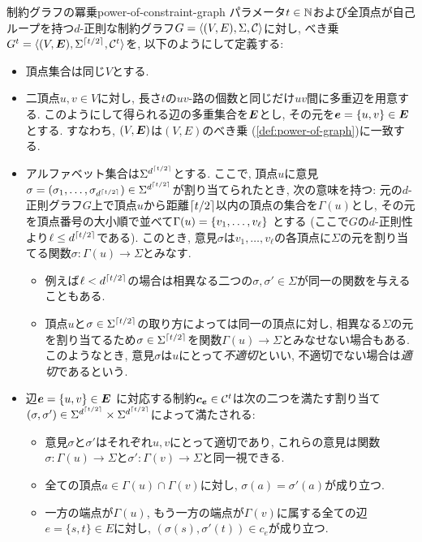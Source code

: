 \begin{definition}{制約グラフの冪乗}{power-of-constraint-graph}
  パラメータ$t\in\mathbb{N}$および全頂点が自己ループを持つ$d$-正則な制約グラフ$G=\langle(V,E),\Sigma,\mathcal{C}\rangle$に対し, べき乗$G^t = \langle(V,\boldsymbol{E}),\Sigma^{\lceil t/2\rceil},\mathcal{C}^t\rangle$を, 以下のようにして定義する:
  \begin{itemize}
    \item 頂点集合は同じ$V$とする.
    \item 二頂点$u,v\in V$に対し, 長さ$t$の$uv$-路の個数と同じだけ$uv$間に多重辺を用意する. このようにして得られる辺の多重集合を$\boldsymbol{E}$とし, その元を$\boldsymbol{e} = \{u,v\} \in \boldsymbol{E}$とする. すなわち, $(V,\boldsymbol{E})$は$(V,E)$のべき乗 (\cref{def:power-of-graph})に一致する.
    \item アルファベット集合は$\Sigma^{d^{\lceil t/2\rceil}}$とする. ここで, 頂点$u$に意見$\sigma=(\sigma_1,\dots,\sigma_{d^{\lceil t/2\rceil}}) \in \Sigma^{d^{\lceil t/2\rceil}}$が割り当てられたとき, 次の意味を持つ: 元の$d$-正則グラフ$G$上で頂点$u$から距離$\lceil t/2\rceil$以内の頂点の集合を$\Gamma(u)$とし, その元を頂点番号の大小順で並べて$\Gamma(u)=\qty{ v_1,\dots,v_\ell}$ とする (ここで$G$の$d$-正則性より$\ell \le d^{\lceil t/2\rceil}$である). このとき, 意見$\sigma$は$v_1,\dots,v_\ell$の各頂点に$\Sigma$の元を割り当てる関数$\sigma \colon \Gamma(u)\to\Sigma$とみなす.
    \begin{itemize}
      \item 例えば$\ell < d^{\lceil t/2\rceil}$の場合は相異なる二つの$\sigma,\sigma'\in\Sigma$が同一の関数を与えることもある.
      \item 頂点$u$と$\sigma\in\Sigma^{\lceil t/2\rceil}$の取り方によっては同一の頂点に対し, 相異なる$\Sigma$の元を割り当てるため$\sigma\in\Sigma^{\lceil t/2\rceil}$を関数$\Gamma(u)\to\Sigma$とみなせない場合もある. このようなとき, 意見$\sigma$は$u$にとって\emph{不適切}といい, 不適切でない場合は\emph{適切}であるという.
    \end{itemize}
    \item 辺$\boldsymbol{e} = \{u,v\} \in \boldsymbol{E}$ に対応する制約$\boldsymbol{c}_{\boldsymbol{e}}\in \mathcal{C}^t$は次の二つを満たす割り当て$(\sigma,\sigma')\in \Sigma^{d^{\lceil t/2\rceil}} \times \Sigma^{d^{\lceil t/2\rceil}}$によって満たされる:
    \begin{itemize}
      \item 意見$\sigma$と$\sigma'$はそれぞれ$u,v$にとって適切であり, これらの意見は関数$\sigma\colon \Gamma(u)\to\Sigma$と$\sigma'\colon \Gamma(v)\to\Sigma$と同一視できる.
      \item 全ての頂点$a\in \Gamma(u)\cap \Gamma(v)$に対し, $\sigma(a)=\sigma'(a)$が成り立つ.
      \item 一方の端点が$\Gamma(u)$, もう一方の端点が$\Gamma(v)$に属する全ての辺$e=\{s,t\}\in E$に対し, $(\sigma(s), \sigma'(t))\in c_e$が成り立つ.
    \end{itemize}
  \end{itemize}
\end{definition}

